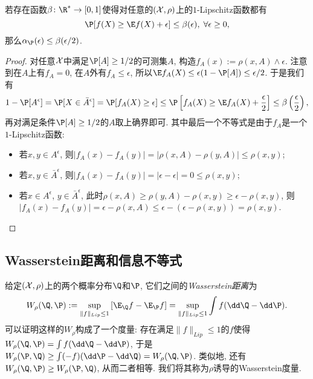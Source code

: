 \begin{theorem}
	若存在函数$\beta \colon \R^* \to [0, 1]$使得对任意的$(\mathcal{X}, \rho)$上的$1$-Lipschitz函数都有
	\begin{equation*}
		\P[f(X) \geq \E f(X) + \epsilon] \leq \beta(\epsilon),\; \forall \epsilon \geq 0, 
	\end{equation*}
	那么$\alpha_{\P}(\epsilon) \leq \beta(\epsilon / 2)$. 
\end{theorem}
\begin{proof}
	对任意$\mathcal{X}$中满足$\P[A] \geq 1/2$的可测集$A$, 构造$f_A(x) := \rho(x, A) \wedge \epsilon$. 
	注意到在$A$上有$f_A = 0$, 在$A$外有$f_A \leq \epsilon$, 所以$\E f_A(X) \leq \epsilon (1 - \P[A]) \leq \epsilon / 2$. 
	于是我们有
	\begin{equation*}
		1 - \P[A^\epsilon]
		= \P[X \in \bar A^{\epsilon}]
		= \P[f_A(X) \geq \epsilon] 
		\leq \P\left[f_A(X) \geq \E f_A(X) + \frac{\epsilon}{2}\right]
		\leq \beta\left( \frac{\epsilon}{2} \right),  
	\end{equation*}
	再对满足条件$\P[A] \geq 1/2$的$A$取上确界即可. 
	其中最后一个不等式是由于$f_A$是一个$1$-Lipschitz函数: 
	\begin{itemize}
		\item 若$x, y \in A^{\epsilon}$, 则$|f_A(x) - f_A(y)| = |\rho(x, A) - \rho(y, A) | \leq  \rho(x, y)$; 
		\item 若$x, y \in \bar A^{\epsilon}$, 则$|f_A(x) - f_A(y)| = |\epsilon - \epsilon| = 0 \leq \rho(x, y)$;
		\item 若$x \in A^{\epsilon}$, $y \in \bar A^{\epsilon}$, 此时$\rho(x, A) \geq \rho(y, A) - \rho(x, y) \geq \epsilon - \rho(x, y)$, 则$|f_A(x) - f_A(y)| =  \epsilon - \rho(x, A) \leq \epsilon - (\epsilon - \rho(x, y)) = \rho(x, y)$.
	\end{itemize}
\end{proof}


\subsection{Wasserstein距离和信息不等式}



给定$(\mathcal{X}, \rho)$上的两个概率分布$\Q$和$\P$, 它们之间的\emph{Wasserstein距离}为
\begin{equation*}
	W_{\rho}(\Q, \P) 
	:= \sup_{\|f\|_{Lip} \leq 1} \left[ \E_{\Q} f - \E_{\P} f \right]
	= \sup_{\|f\|_{Lip} \leq 1} \int f (\dd \Q - \dd \P). 
\end{equation*}
可以证明这样的$W_{\rho}$构成了一个度量: 
存在满足$\|f\|_{Lip} \leq 1$的$f$使得$W_{\rho}(\Q, \P) = \int f (\dd \Q - \dd \P)$, 于是$W_{\rho}(\P, \Q) \geq \int (-f) (\dd \P - \dd \Q) = W_{\rho}(\Q, \P)$. 
类似地, 还有$W_{\rho}(\Q, \P) \geq W_{\rho}(\P, \Q)$, 从而二者相等. 
我们将其称为$\rho$诱导的Wasserstein度量. 

